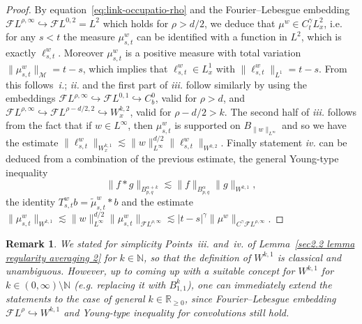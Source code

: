 \documentclass[10pt]{article}
\newcommand{\tmtextit}[1]{{\itshape{#1}}}
\newtheorem{remark}[theorem]{Remark}
\begin{document}
\begin{proof}
  By equation~\eqref{eq:link-occupatio-rho} and the Fourier--Lebesgue
  embedding $\mathcal{F} L^{\rho, \infty} \hookrightarrow \mathcal{F} L^{0, 2}
  = L^2$ which holds for $\rho > d / 2$, we deduce that $\mu^w \in
  C^{\gamma}_t L^2_x$, i.e. for any $s < t$ the measure $\mu_{s, t}^w$ can be
  identified with a function in $L^2$, which is exactly $\ell^w_{s, t}$.
  Moreover $\mu^w_{s, t}$ is a positive measure with total variation $\|
  \mu^w_{s, t} \|_{\mathcal{M}} = t - s$, which implies that $\ell^w_{s, t}
  \in L^1_x$ with $\| \ell^w_{s, t} \|_{L^1} = t - s$. From this
  follows~\tmtextit{i.}; \tmtextit{ii.} and the first part of \tmtextit{iii.}
  follow similarly by using the embeddings $\mathcal{F} L^{\rho, \infty}
  \hookrightarrow \mathcal{F} L^{0, 1} \hookrightarrow C^0_b$, valid for $\rho
  > d$, and $\mathcal{F} L^{\rho, \infty} \hookrightarrow \mathcal{F} L^{\rho
  - d / 2, 2} \hookrightarrow W^{k, 2}_x$, valid for $\rho - d / 2 > k$. The
  second half of \tmtextit{iii.} follows from the fact that if $w \in
  L^{\infty}$, then $\mu^w_{s, t}$ is supported on $B_{\| w \|_{L^{\infty}}}$
  and so we have the estimate $\| \ell^w_{s, t} \|_{W^{k, 1}_x} \lesssim \| w
  \|_{L^{\infty}}^{d / 2} \| \ell^w_{s, t} \|_{W^{k, 2}}$. Finally statement
  \tmtextit{iv.} can be deduced from a combination of the previous estimate,
  the general Young\mbox{-}type inequality
  \[ \| f \ast g \|_{B^{\alpha + k}_{p, q}} \lesssim \| f \|_{B^{\alpha}_{p,
     q}}  \| g \|_{W^{k, 1}}, \]
  the identity $T^w_{s, t} b = \tilde{\mu}^w_{s, t} \ast b$ and the estimate
  $\| \mu^w_{s, t} \|_{W^{k, 1}} \lesssim \| w\|_{L^\infty}^{d/2} \| \mu_{s, t}^w \|_{\mathcal{F} L^{\rho,
  \infty}} \lesssim | t - s |^{\gamma}  \| \mu^w \|_{C^{\gamma} \mathcal{F}
  L^{\rho, \infty}}$.
\end{proof}

\begin{remark}
  We stated for simplicity Points~\tmtextit{iii.} and~\tmtextit{iv.} of
  Lemma~\ref{sec2.2 lemma regularity averaging 2} for $k \in \mathbb{N}$, so
  that the definition of $W^{k, 1}$ is classical and unambiguous. However, up
  to coming up with a suitable concept for $W^{k, 1}$ for $k \in (0, \infty)
  \setminus \mathbb{N}$ (e.g. replacing it with ${B^k_{1, 1}} $), one can
  immediately extend the statements to the case of general $k \in
  \mathbb{R}_{\geqslant 0}$, since Fourier--Lebesgue embedding $\mathcal{F}
  L^{\rho} \hookrightarrow W^{k, 1}$ and Young\mbox{-}type inequality for
  convolutions still hold.
\end{remark}
\end{document}
